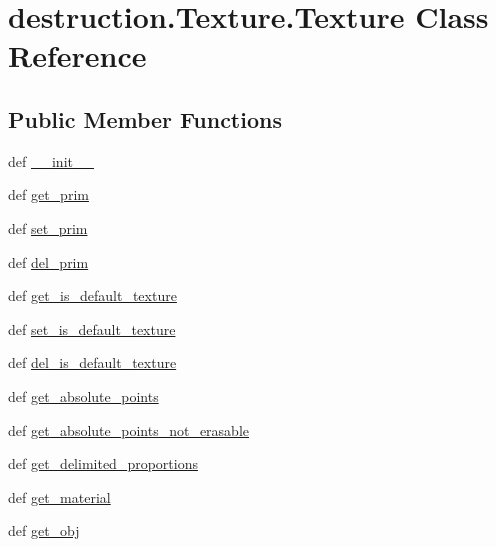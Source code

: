 \hypertarget{classdestruction_1_1_texture_1_1_texture}{\section{destruction.\-Texture.\-Texture Class Reference}
\label{classdestruction_1_1_texture_1_1_texture}
}
\subsection*{Public Member Functions}
\begin{DoxyCompactItemize}
\item 
def \hyperlink{classdestruction_1_1_texture_1_1_texture_aa340dbf5ad34b01964a820786579d215}{\-\_\-\-\_\-init\-\_\-\-\_\-}
\item 
def \hyperlink{classdestruction_1_1_texture_1_1_texture_a3ac7ab3a49f842f04b6866b5f5a165e8}{get\-\_\-prim}
\item 
def \hyperlink{classdestruction_1_1_texture_1_1_texture_adbb27365cab90eefb5018b926600f231}{set\-\_\-prim}
\item 
def \hyperlink{classdestruction_1_1_texture_1_1_texture_a74d8db55624f2386c3b2eecfa35cb12c}{del\-\_\-prim}
\item 
def \hyperlink{classdestruction_1_1_texture_1_1_texture_ad03f5421ecb8ba88ae56e7d3d41e6276}{get\-\_\-is\-\_\-default\-\_\-texture}
\item 
def \hyperlink{classdestruction_1_1_texture_1_1_texture_a53b771339a453423d363b0492dbf0d80}{set\-\_\-is\-\_\-default\-\_\-texture}
\item 
def \hyperlink{classdestruction_1_1_texture_1_1_texture_a59fe414f8b4a60df7d8db40b1ca73389}{del\-\_\-is\-\_\-default\-\_\-texture}
\item 
def \hyperlink{classdestruction_1_1_texture_1_1_texture_a9d1e816c6435518f233f311e34974f68}{get\-\_\-absolute\-\_\-points}
\item 
def \hyperlink{classdestruction_1_1_texture_1_1_texture_aa7727aff18f3f8e5c9648ac1ff0eb012}{get\-\_\-absolute\-\_\-points\-\_\-not\-\_\-erasable}
\item 
def \hyperlink{classdestruction_1_1_texture_1_1_texture_a373ae91a8a11c2b58ad3a3cb36dbbb86}{get\-\_\-delimited\-\_\-proportions}
\item 
def \hyperlink{classdestruction_1_1_texture_1_1_texture_acf764b2eeeb72036a537fe5de0726640}{get\-\_\-material}
\item 
def \hyperlink{classdestruction_1_1_texture_1_1_texture_a99100bbc8124a1d3c1cf4cdfb13bf9f9}{get\-\_\-obj}

\end{DoxyCompactItemize}
